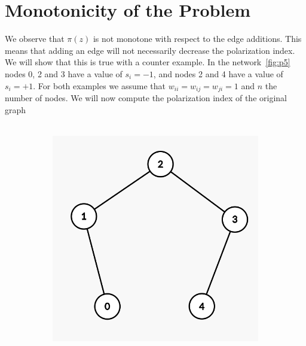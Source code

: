 \section{Monotonicity of the Problem}
\label{sec:monotonicity}
\vspace{20pt}
We observe that $\pi(z)$ is not monotone with respect to the edge additions. This means that adding an edge will not necessarily decrease the polarization index. We will  show that this is true with a counter example. In the network~\ref{fig:p5} nodes 0, 2 and 3 have a value of $s_i=-1$, and nodes 2 and 4 have a value of $s_i=+1$. For both examples we assume that $w_{ii}=w_{ij}=w_{ji}=1$ and $n$ the number of nodes.
We will now compute the polarization index of the original graph
\\
\\
\begin{figure}[h]
	\centering
	\begin{subfigure}[t]{0.3\textwidth}
		\centering
		\includegraphics[height=0.15\textheight]{Figures/p5A}
		\caption{}
		\label{subfig:monotonicityA}
	\end{subfigure}
	\hfill
	\begin{subfigure}[t]{0.3\textwidth}
		\centering

\end{subfigure}
\end{figure}
